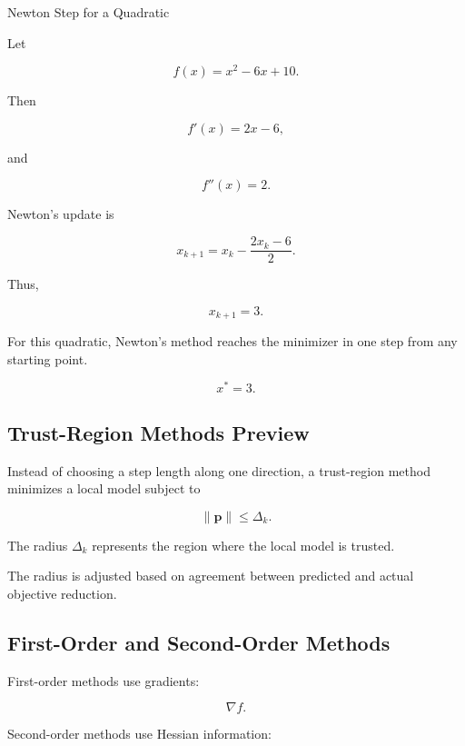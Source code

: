 \begin{workedexamplebox}{Newton Step for a Quadratic}

Let

\[
f(x)
=
x^2-6x+10.
\]

Then

\[
f'(x)=2x-6,
\]

and

\[
f''(x)=2.
\]

Newton's update is

\[
x_{k+1}
=
x_k
-
\frac{
2x_k-6
}{
2
}.
\]

Thus,

\[
x_{k+1}
=
3.
\]

For this quadratic, Newton's method reaches the minimizer in one step from
any starting point.

\begin{answerbox}
\[
\boxed{
x^*=3.
}
\]
\end{answerbox}

\end{workedexamplebox}

\subsection{Trust-Region Methods Preview}
\label{subsec:trust-region-preview}

Instead of choosing a step length along one direction, a trust-region
method minimizes a local model subject to

\[
\boxed{
\|\mathbf{p}\|
\leq
\Delta_k.
}
\]

The radius \(\Delta_k\) represents the region where the local model is
trusted.

The radius is adjusted based on agreement between predicted and actual
objective reduction.

\subsection{First-Order and Second-Order Methods}
\label{subsec:first-second-order-methods}

First-order methods use gradients:

\[
\boxed{
\nabla f.
}
\]

Second-order methods use Hessian information:

